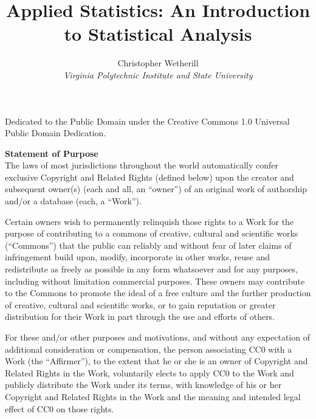 \documentclass{tufte-book}
\title{Applied Statistics: An Introduction to Statistical Analysis}
\author[Christopher Wetherill]{Christopher Wetherill\\[-0.5cm] {\noindent \small \itshape Virginia Polytechnic Institute and State University}}
\begin{document}
	
	\newcommand{\HRule}{\rule{\linewidth}{0.5mm}}
	
	\newcommand{\mytilde}{$\sim$}
	
	\newdimen\SpaceAboveChapterNumber
	\SpaceAboveChapterNumber=36pt


	\maketitle


	\begin{fullwidth}
	\thispagestyle{empty}
	\setlength{\parindent}{0pt}
	\setlength{\parskip}{\baselineskip}
	
	\par Dedicated to the Public Domain under the Creative Commons 1.0 Universal Public Domain Dedication. 
	
	\noindent \textbf{Statement of Purpose} \\

	The laws of most jurisdictions throughout the world automatically confer exclusive Copyright and Related Rights (defined below) upon the creator and subsequent owner(s) (each and all, an ``owner'') of an original work of authorship and/or a database (each, a ``Work'').
	
	Certain owners wish to permanently relinquish those rights to a Work for the purpose of contributing to a commons of creative, cultural and scientific works (``Commons'') that the public can reliably and without fear of later claims of infringement build upon, modify, incorporate in other works, reuse and redistribute as freely as possible in any form whatsoever and for any purposes, including without limitation commercial purposes. These owners may contribute to the Commons to promote the ideal of a free culture and the further production of creative, cultural and scientific works, or to gain reputation or greater distribution for their Work in part through the use and
	efforts of others.
	
	For these and/or other purposes and motivations, and without any expectation of additional consideration or compensation, the person associating CC$0$ with a Work (the ``Affirmer''), to the extent that he or she is an owner of Copyright and Related Rights in the Work, voluntarily elects to apply CC$0$ to the Work and publicly distribute the Work under its terms, with knowledge of his or her Copyright and Related Rights in the Work and the meaning and intended legal effect of CC$0$ on those rights.
	

\end{fullwidth}
\end{document}

